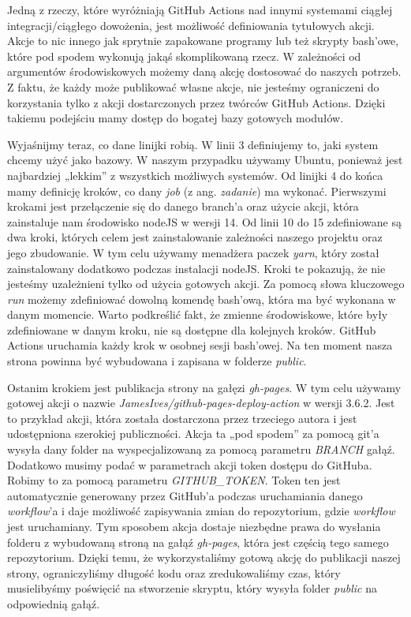 \par
Jedną z rzeczy, które wyróżniają GitHub Actions nad innymi systemami ciągłej integracji/ciągłego dowożenia, jest możliwość definiowania tytułowych akcji. Akcje to nic innego jak sprytnie zapakowane programy lub też skrypty bash'owe, które pod spodem wykonują jakąś skomplikowaną rzecz. W zależności od argumentów środowiskowych możemy daną akcję dostosować do naszych potrzeb. Z faktu, że każdy może publikować własne akcje, nie jesteśmy ograniczeni do korzystania tylko z akcji dostarczonych przez twórców GitHub Actions. Dzięki takiemu podejściu mamy dostęp do bogatej bazy gotowych modułów.
\par
Wyjaśnijmy teraz, co dane linijki robią. W linii 3 definiujemy to, jaki system chcemy użyć jako bazowy. W naszym przypadku używamy Ubuntu, ponieważ jest najbardziej „lekkim” z wszystkich możliwych systemów. Od linijki 4 do końca mamy definicję kroków, co dany \textit{job} (z ang. \textit{zadanie}) ma wykonać. Pierwszymi krokami jest przełączenie się do danego branch'a oraz użycie akcji, która zainstaluje nam środowisko nodeJS w wersji 14. Od linii 10 do 15 zdefiniowane są dwa kroki, których celem jest zainstalowanie zależności naszego projektu oraz jego zbudowanie. W tym celu używamy menadżera paczek \textit{yarn}, który został zainstalowany dodatkowo podczas instalacji nodeJS. Kroki te pokazują, że nie jesteśmy uzależnieni tylko od użycia gotowych akcji. Za pomocą słowa kluczowego \textit{run} możemy zdefiniować dowolną komendę bash'ową, która ma być wykonana w danym momencie. Warto podkreślić fakt, że zmienne środowiskowe, które były zdefiniowane w danym kroku, nie są dostępne dla kolejnych kroków. GitHub Actions uruchamia każdy krok w osobnej sesji bash'owej. Na ten moment nasza strona powinna być wybudowana i zapisana w folderze \textit{public}.
\par
Ostanim krokiem jest publikacja strony na gałęzi \textit{gh-pages}. W tym celu używamy gotowej akcji o nazwie \textit{JamesIves/github-pages-deploy-action} w wersji 3.6.2. Jest to przykład akcji, która została dostarczona przez trzeciego autora i jest udostępniona szerokiej publiczności. Akcja ta „pod spodem” za pomocą git'a wysyła dany folder na wyspecjalizowaną za pomocą parametru \textit{BRANCH} gałąź. Dodatkowo musimy podać w parametrach akcji token dostępu do GitHuba. Robimy to za pomocą parametru \textit{GITHUB\_TOKEN}. Token ten jest automatycznie generowany przez GitHub'a podczas uruchamiania danego \textit{workflow}'a i daje możliwość zapisywania zmian do repozytorium, gdzie \textit{workflow} jest uruchamiany. Tym sposobem akcja dostaje niezbędne prawa do wysłania folderu z wybudowaną stroną na gałąź \textit{gh-pages}, która jest częścią tego samego repozytorium. Dzięki temu, że wykorzystaliśmy gotową akcję do publikacji naszej strony, ograniczyliśmy długość kodu oraz zredukowaliśmy czas, który musielibyśmy poświęcić na stworzenie skryptu, który wysyła folder \textit{public} na odpowiednią gałąź.

